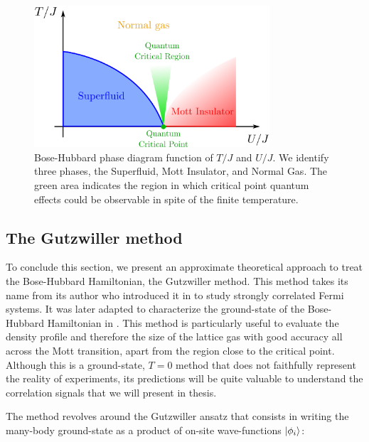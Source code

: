 \begin{figure}
    \centering
    \includegraphics[width=0.78\textwidth]{Fig/Chapter2/phase_diagram.png}
    \caption{Bose-Hubbard phase diagram function of $T/J$ and $U/J$. We identify three phases, the Superfluid, Mott Insulator, and Normal Gas. The green area indicates the region in which critical point quantum effects could be observable in spite of the finite temperature.}
    \label{fig:phase_diagram}
\end{figure}



\subsection{The Gutzwiller method}

To conclude this section, we present an approximate theoretical approach to treat the Bose-Hubbard Hamiltonian, the Gutzwiller method. This method takes its name from its author who introduced it in \cite{gutzwiller1963effect} to study strongly correlated Fermi systems. It was later adapted to characterize the ground-state of the Bose-Hubbard Hamiltonian in \cite{rokhsar1991gutzwiller}. This method is particularly useful to evaluate the density profile and therefore the size of the lattice gas with good accuracy all across the Mott transition, apart from the region close to the critical point. Although this is a ground-state, $T=0$ method that does not faithfully represent the reality of experiments, its predictions will be quite valuable to understand the correlation signals that we will present in thesis.

The method revolves around the Gutzwiller ansatz that consists in writing the many-body ground-state as a product of on-site wave-functions $\ket{\phi_i}$:

